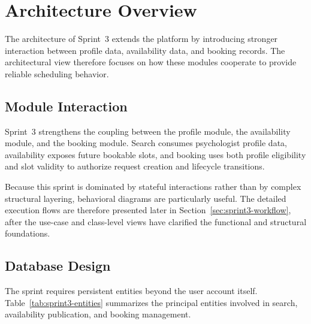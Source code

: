 \documentclass[a4paper,12pt]{report}
\begin{document}
\section{Architecture Overview}
\label{sec:sprint3-architecture}

The architecture of Sprint~3 extends the platform by introducing stronger interaction between profile data, availability data, and booking records. The architectural view therefore focuses on how these modules cooperate to provide reliable scheduling behavior.

\subsection{Module Interaction}

Sprint~3 strengthens the coupling between the profile module, the availability module, and the booking module. Search consumes psychologist profile data, availability exposes future bookable slots, and booking uses both profile eligibility and slot validity to authorize request creation and lifecycle transitions.

Because this sprint is dominated by stateful interactions rather than by complex structural layering, behavioral diagrams are particularly useful. The detailed execution flows are therefore presented later in Section~\ref{sec:sprint3-workflow}, after the use-case and class-level views have clarified the functional and structural foundations.

\subsection{Database Design}

The sprint requires persistent entities beyond the user account itself. Table~\ref{tab:sprint3-entities} summarizes the principal entities involved in search, availability publication, and booking management.
\end{document}
